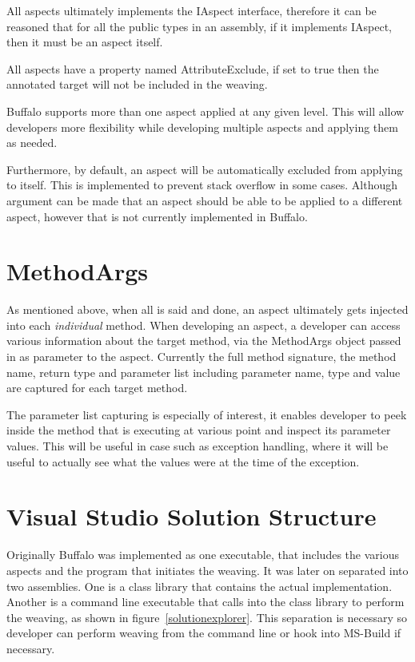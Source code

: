 All aspects ultimately implements the IAspect interface, therefore it can be reasoned that for all the public types in an assembly, if it implements IAspect, then it must be an aspect itself.

All aspects have a property named AttributeExclude, if set to true then the annotated target will not be included in the weaving.

Buffalo supports more than one aspect applied at any given level. This will allow developers more flexibility while developing multiple aspects and applying them as needed.

Furthermore, by default, an aspect will be automatically excluded from applying to itself. This is implemented to prevent stack overflow in some cases. Although argument can be made that an aspect should be able to be applied to a different aspect, however that is not currently implemented in Buffalo.

\section{MethodArgs}

As mentioned above, when all is said and done, an aspect ultimately gets injected into each \textit{individual} method. When developing an aspect, a developer can access various information about the target method, via the MethodArgs object passed in as parameter to the aspect. Currently the full method signature, the method name, return type and parameter list including parameter name, type and value are captured for each target method.

The parameter list capturing is especially of interest, it enables developer to peek inside the method that is executing at various point and inspect its parameter values. This will be useful in case such as exception handling, where it will be useful to actually see what the values were at the time of the exception.

\section{Visual Studio Solution Structure}

Originally Buffalo was implemented as one executable, that includes the various aspects and the program that initiates the weaving. It was later on separated into two assemblies. One is a class library that contains the actual implementation. Another is a command line executable that calls into the class library to perform the weaving, as shown in figure~\ref{solutionexplorer}. This separation is necessary so developer can perform weaving from the command line or hook into MS-Build if necessary. 

